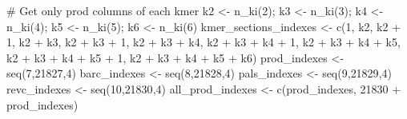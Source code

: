 \documentclass[
  letterpaper,
  DIV=11,
  numbers=noendperiod]{scrartcl}
\newenvironment{Shaded}{\begin{snugshade}}{\end{snugshade}}
\newcommand{\CommentTok}[1]{\textcolor[rgb]{0.37,0.37,0.37}{#1}}
\newcommand{\DecValTok}[1]{\textcolor[rgb]{0.68,0.00,0.00}{#1}}
\newcommand{\FunctionTok}[1]{\textcolor[rgb]{0.28,0.35,0.67}{#1}}
\newcommand{\NormalTok}[1]{\textcolor[rgb]{0.00,0.23,0.31}{#1}}
\newcommand{\OtherTok}[1]{\textcolor[rgb]{0.00,0.23,0.31}{#1}}
\newcommand{\SpecialCharTok}[1]{\textcolor[rgb]{0.37,0.37,0.37}{#1}}
\begin{document}
\begin{Shaded}
\begin{Highlighting}[]
\CommentTok{\# Get only \textquotesingle{}prod\textquotesingle{} columns of each kmer}
\NormalTok{k2 }\OtherTok{\textless{}{-}} \FunctionTok{n\_ki}\NormalTok{(}\DecValTok{2}\NormalTok{); k3 }\OtherTok{\textless{}{-}} \FunctionTok{n\_ki}\NormalTok{(}\DecValTok{3}\NormalTok{); k4 }\OtherTok{\textless{}{-}} \FunctionTok{n\_ki}\NormalTok{(}\DecValTok{4}\NormalTok{); k5 }\OtherTok{\textless{}{-}} \FunctionTok{n\_ki}\NormalTok{(}\DecValTok{5}\NormalTok{); k6 }\OtherTok{\textless{}{-}} \FunctionTok{n\_ki}\NormalTok{(}\DecValTok{6}\NormalTok{) }
\NormalTok{kmer\_sections\_indexes }\OtherTok{\textless{}{-}} \FunctionTok{c}\NormalTok{(}\DecValTok{1}\NormalTok{, }
\NormalTok{                           k2, }
\NormalTok{                           k2 }\SpecialCharTok{+} \DecValTok{1}\NormalTok{, }
\NormalTok{                           k2 }\SpecialCharTok{+}\NormalTok{ k3, }
\NormalTok{                           k2 }\SpecialCharTok{+}\NormalTok{ k3 }\SpecialCharTok{+} \DecValTok{1}\NormalTok{,}
\NormalTok{                           k2 }\SpecialCharTok{+}\NormalTok{ k3 }\SpecialCharTok{+}\NormalTok{ k4, }
\NormalTok{                           k2 }\SpecialCharTok{+}\NormalTok{ k3 }\SpecialCharTok{+}\NormalTok{ k4 }\SpecialCharTok{+} \DecValTok{1}\NormalTok{,}
\NormalTok{                           k2 }\SpecialCharTok{+}\NormalTok{ k3 }\SpecialCharTok{+}\NormalTok{ k4 }\SpecialCharTok{+}\NormalTok{ k5, }
\NormalTok{                           k2 }\SpecialCharTok{+}\NormalTok{ k3 }\SpecialCharTok{+}\NormalTok{ k4 }\SpecialCharTok{+}\NormalTok{ k5 }\SpecialCharTok{+} \DecValTok{1}\NormalTok{, }
\NormalTok{                           k2 }\SpecialCharTok{+}\NormalTok{ k3 }\SpecialCharTok{+}\NormalTok{ k4 }\SpecialCharTok{+}\NormalTok{ k5 }\SpecialCharTok{+}\NormalTok{ k6)}
\NormalTok{prod\_indexes }\OtherTok{\textless{}{-}} \FunctionTok{seq}\NormalTok{(}\DecValTok{7}\NormalTok{,}\DecValTok{21827}\NormalTok{,}\DecValTok{4}\NormalTok{)}
\NormalTok{barc\_indexes }\OtherTok{\textless{}{-}} \FunctionTok{seq}\NormalTok{(}\DecValTok{8}\NormalTok{,}\DecValTok{21828}\NormalTok{,}\DecValTok{4}\NormalTok{)}
\NormalTok{pals\_indexes }\OtherTok{\textless{}{-}} \FunctionTok{seq}\NormalTok{(}\DecValTok{9}\NormalTok{,}\DecValTok{21829}\NormalTok{,}\DecValTok{4}\NormalTok{)}
\NormalTok{revc\_indexes }\OtherTok{\textless{}{-}} \FunctionTok{seq}\NormalTok{(}\DecValTok{10}\NormalTok{,}\DecValTok{21830}\NormalTok{,}\DecValTok{4}\NormalTok{)}
\NormalTok{all\_prod\_indexes }\OtherTok{\textless{}{-}} \FunctionTok{c}\NormalTok{(prod\_indexes, }\DecValTok{21830} \SpecialCharTok{+}\NormalTok{ prod\_indexes)}

\end{Highlighting}
\end{Shaded}
\end{document}

